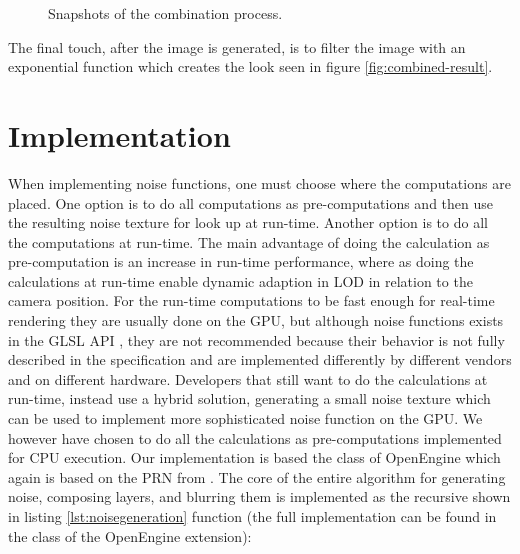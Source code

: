\begin{figure}[!h]
    \centering
  \hspace{4mm}
  \hspace{4mm}
  \hspace{4mm}
  \caption{Snapshots of the combination process.}
  \label{fig:combined-layers}
\end{figure}

The final touch, after the image is generated, is to filter the image
with an exponential function which creates the look seen in figure
\ref{fig:combined-result}.

\section{Implementation}
When implementing noise functions, one must choose where the
computations are placed. One option is to do all computations as
pre-computations and then use the resulting noise texture for look up
at run-time. Another option is to do all the computations at
run-time. The main advantage of doing the calculation as pre-computation
is an increase in run-time performance, where as doing the calculations
at run-time enable dynamic adaption in LOD in relation to the camera
position. For the run-time computations to be fast enough for
real-time rendering they are usually done on the GPU, but although noise
functions exists in the GLSL API ,
they are not recommended because
their behavior is not fully described in the specification and are
implemented differently by different vendors and on different
hardware. Developers that still want to do the calculations
at run-time, instead use a hybrid solution, generating a small noise
texture which can be used to implement more sophisticated noise
function on the GPU.
%
We however have chosen to do all the calculations as pre-computations
implemented for CPU execution. Our implementation is based the
 class of OpenEngine which again is based on the
PRN from .
%
The core of the entire algorithm for generating noise, composing
layers, and blurring them is implemented as the recursive shown in
listing \ref{lst:noisegeneration}
function (the full implementation can be found in the 
class of the  OpenEngine extension):

